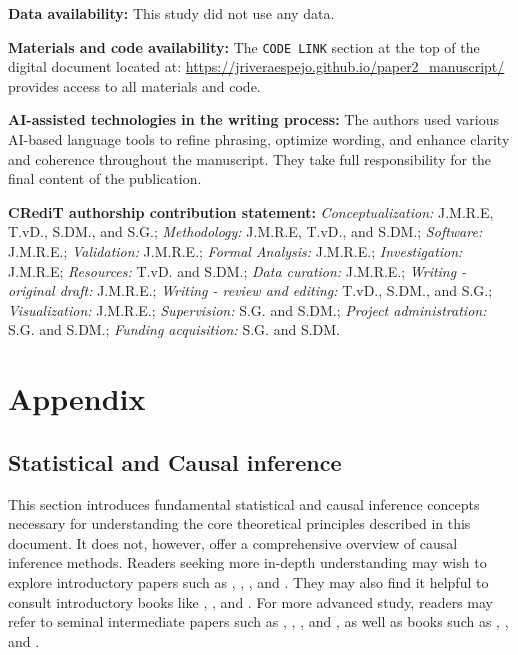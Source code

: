 \documentclass[
  authoryear,
  review,
  1p]{elsarticle}
\begin{document}
\textbf{Data availability:} This study did not use any data.

\textbf{Materials and code availability:} The \texttt{CODE\ LINK}
section at the top of the digital document located at:
\url{https://jriveraespejo.github.io/paper2_manuscript/} provides access
to all materials and code.

\textbf{AI-assisted technologies in the writing process:} The authors
used various AI-based language tools to refine phrasing, optimize
wording, and enhance clarity and coherence throughout the manuscript.
They take full responsibility for the final content of the publication.

\textbf{CRediT authorship contribution statement:}
\emph{Conceptualization:} J.M.R.E, T.vD., S.DM., and S.G.;
\emph{Methodology:} J.M.R.E, T.vD., and S.DM.; \emph{Software:}
J.M.R.E.; \emph{Validation:} J.M.R.E.; \emph{Formal Analysis:} J.M.R.E.;
\emph{Investigation:} J.M.R.E; \emph{Resources:} T.vD. and S.DM.;
\emph{Data curation:} J.M.R.E.; \emph{Writing - original draft:}
J.M.R.E.; \emph{Writing - review and editing:} T.vD., S.DM., and S.G.;
\emph{Visualization:} J.M.R.E.; \emph{Supervision:} S.G. and S.DM.;
\emph{Project administration:} S.G. and S.DM.; \emph{Funding
acquisition:} S.G. and S.DM.

\newpage{}

\section{Appendix}\label{sec-appendix}

\subsection{Statistical and Causal inference}\label{sec-appendixB}

This section introduces fundamental statistical and causal inference
concepts necessary for understanding the core theoretical principles
described in this document. It does not, however, offer a comprehensive
overview of causal inference methods. Readers seeking more in-depth
understanding may wish to explore introductory papers such as
\citet{Pearl_2010}, \citet{Rohrer_2018}, \citet{Pearl_2019}, and
\citet{Cinelli_et_al_2020}. They may also find it helpful to consult
introductory books like \citet{Pearl_et_al_2018}, \citet{Neal_2020}, and
\citet{McElreath_2020}. For more advanced study, readers may refer to
seminal intermediate papers such as \citet{Neyman_et_al_1923},
\citet{Rubin_1974}, \citet{Spirtes_et_al_1991}, and \citet{Sekhon_2009},
as well as books such as \citet{Pearl_2009}, \citet{Morgan_et_al_2014},
and \citet{Hernan_et_al_2020}.
\end{document}
